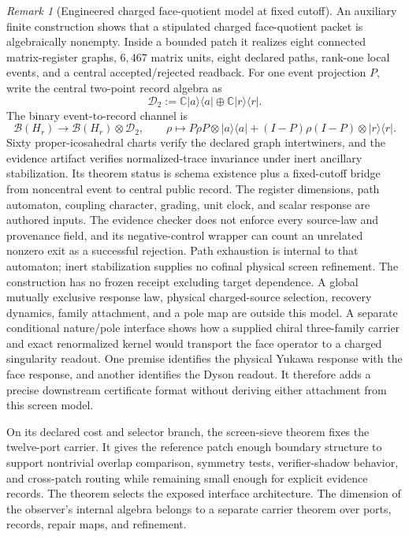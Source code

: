 \documentclass[11pt]{article}
\theoremstyle{remark}
\newtheorem{remark}[theorem]{Remark}
\theoremstyle{plain}
\begin{document}
\begin{remark}[Engineered charged face-quotient model at fixed cutoff]
An auxiliary finite construction shows that a stipulated charged face-quotient
packet is algebraically nonempty. Inside a bounded patch it realizes eight
connected matrix-register graphs, \(6{,}467\) matrix units, eight declared
paths, rank-one local events, and a central accepted/rejected readback. For one
event projection \(P\), write the central two-point record algebra as
\[
 \mathcal D_2
 :=\mathbb C|a\rangle\!\langle a|
 \oplus\mathbb C|r\rangle\!\langle r|.
\]
The binary event-to-record channel is
\[
 \mathcal B(H_r)\longrightarrow \mathcal B(H_r)\otimes\mathcal D_2,
 \qquad
 \rho\longmapsto P\rho P\otimes |a\rangle\!\langle a|
 +(I-P)\rho(I-P)\otimes |r\rangle\!\langle r|.
\]
Sixty proper-icosahedral charts verify the declared graph intertwiners, and the
evidence artifact verifies normalized-trace invariance under inert ancillary
stabilization. Its theorem status is schema existence plus a fixed-cutoff
bridge from noncentral event to central public record. The register dimensions,
path automaton, coupling character, grading, unit clock, and scalar response
are authored inputs. The evidence checker does not enforce every source-law
and provenance field, and its negative-control wrapper can count an unrelated
nonzero exit as a successful rejection. Path exhaustion is internal to that automaton; inert
stabilization supplies no cofinal physical screen refinement. The construction
has no frozen receipt excluding target dependence. A global
mutually exclusive response law, physical charged-source selection, recovery
dynamics, family attachment, and a pole map are outside this model.
A separate conditional nature/pole interface shows how a supplied chiral
three-family carrier and exact renormalized kernel would transport the face
operator to a charged singularity readout. One premise identifies the physical
Yukawa response with the face response, and another identifies the Dyson
readout. It therefore adds a precise downstream
certificate format without deriving either attachment from this screen model.
\end{remark}

On its declared cost and selector branch, the screen-sieve theorem fixes the
twelve-port carrier. It gives the reference patch enough boundary structure to support nontrivial overlap
comparison, symmetry tests, verifier-shadow behavior, and cross-patch routing
while remaining small enough for explicit evidence records.
The theorem selects the exposed interface architecture. The dimension of the observer's internal
algebra belongs to a separate carrier theorem over ports, records, repair maps, and refinement.
\end{document}
